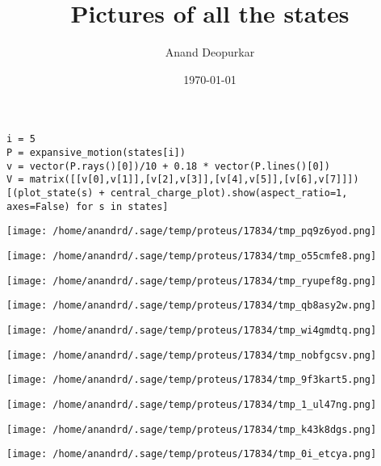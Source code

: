 \documentclass[11pt]{article}
\author{Anand Deopurkar}
\date{\today}
\title{Pictures of all the states}
\begin{document}
\maketitle
\tableofcontents

\begin{verbatim}
i = 5
P = expansive_motion(states[i])
v = vector(P.rays()[0])/10 + 0.18 * vector(P.lines()[0])
V = matrix([[v[0],v[1]],[v[2],v[3]],[v[4],v[5]],[v[6],v[7]]])
[(plot_state(s) + central_charge_plot).show(aspect_ratio=1, axes=False) for s in states]
\end{verbatim}
\begin{center}
\texttt{[image: /home/anandrd/.sage/temp/proteus/17834/tmp\_pq9z6yod.png]}
\end{center}
\begin{center}
\texttt{[image: /home/anandrd/.sage/temp/proteus/17834/tmp\_o55cmfe8.png]}
\end{center}
\begin{center}
\texttt{[image: /home/anandrd/.sage/temp/proteus/17834/tmp\_ryupef8g.png]}
\end{center}
\begin{center}
\texttt{[image: /home/anandrd/.sage/temp/proteus/17834/tmp\_qb8asy2w.png]}
\end{center}
\begin{center}
\texttt{[image: /home/anandrd/.sage/temp/proteus/17834/tmp\_wi4gmdtq.png]}
\end{center}
\begin{center}
\texttt{[image: /home/anandrd/.sage/temp/proteus/17834/tmp\_nobfgcsv.png]}
\end{center}
\begin{center}
\texttt{[image: /home/anandrd/.sage/temp/proteus/17834/tmp\_9f3kart5.png]}
\end{center}
\begin{center}
\texttt{[image: /home/anandrd/.sage/temp/proteus/17834/tmp\_1\_ul47ng.png]}
\end{center}
\begin{center}
\texttt{[image: /home/anandrd/.sage/temp/proteus/17834/tmp\_k43k8dgs.png]}
\end{center}
\begin{center}
\texttt{[image: /home/anandrd/.sage/temp/proteus/17834/tmp\_0i\_etcya.png]}
\end{center}
\end{document}
